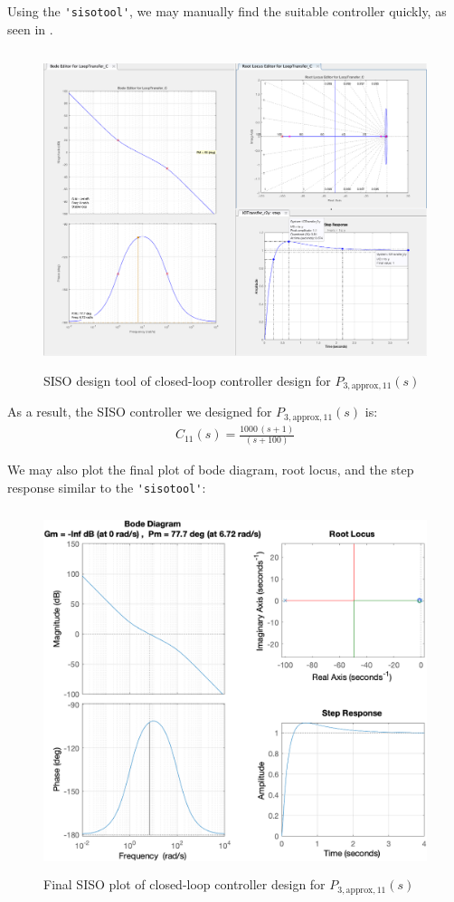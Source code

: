 \documentclass{tron}
\newcommand{\apx}{\text{approx}}
\begin{document}
Using the \verb|'sisotool'|, we may manually find the suitable controller quickly, as seen in .
\begin{figure}[H]
	\centering
	\includegraphics[height=350px]{../matlab/misc/sisotool_P3_aug_11.png}
	\caption{SISO design tool of closed-loop controller design for $P_{3, \apx, 11}(s)$}
	\label{fig:p5:P3_aug11:siso}
\end{figure}

As a result, the SISO controller we designed for $P_{3, \apx, 11}(s)$ is: 
\begin{align}
	C_{11}(s) = \frac{1000 \, (s + 1)}{(s + 100)}	
	\label{eqn:p5:c11}
\end{align}

We may also plot the final plot of bode diagram, root locus, and the step response similar to the \verb|'sisotool'|:
\begin{figure}[H]
	\centering
	\includegraphics[height=400px]{../matlab/output/p5/siso_plot_Ideal(1,1)}
	\caption{Final SISO plot of closed-loop controller design for $P_{3, \apx, 11}(s)$}
	\label{fig:p5:P3_aug11:siso-final}
\end{figure}
\end{document}
